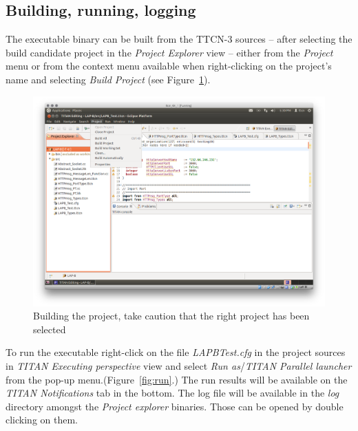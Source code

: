 \documentclass[a4paper]{article}
\begin{document}
\subsection{Building, running, logging}

The executable binary can be built from the TTCN-3 sources -- after selecting the build candidate project in the \textit{Project Explorer} view -- either from the \textit{Project} menu or from the context menu available when right-clicking on the project's name and selecting \textit{Build Project} (see Figure~\ref{fig:build}).

\begin{figure}[H]
  \centering
  \includegraphics[width=\textwidth]{figures/build.png}
  \caption{Building the project, take caution that the right project has been selected}
  \label{fig:build}
\end{figure}

To run the executable right-click on the file \textit{LAPB{\textunderscore}Test.cfg} in the project sources in \textit{TITAN Executing perspective} view and select \textit{Run as}/\textit{TITAN Parallel launcher} from the pop-up menu.(Figure~\ref{fig:run}.)
The run results will be available on the \textit{TITAN Notifications} tab in the bottom. The log file will be available in the \textit{log} directory amongst the \textit{Project explorer} binaries. Those can be opened by double clicking on them.
\end{document}
